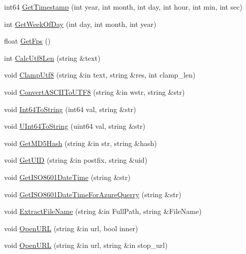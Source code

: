 \begin{DoxyCompactItemize}
\item 
int64 \hyperlink{class_scene_script_core_utils_a106ae27358ab3b6cc073665ca13ade2a}{Get\+Timestamp} (int year, int month, int day, int hour, int min, int sec)
\item 
int \hyperlink{class_scene_script_core_utils_a5600deb19c410de48dcfea3b5231f4e1}{Get\+Week\+Of\+Day} (int day, int month, int year)
\item 
float \hyperlink{class_scene_script_core_utils_a7380a399dd6dc66de6d0ebb94730269e}{Get\+Fps} ()
\item 
int \hyperlink{class_scene_script_core_utils_a3fc4ba1bbf123ddb308dc694074a61d9}{Calc\+Utf8\+Len} (string \&text)
\item 
void \hyperlink{class_scene_script_core_utils_a37741b646b2e6f68cf3b5a320379b4a6}{Clamp\+Utf8} (string \&in text, string \&res, int clamp\+\_\+len)
\item 
void \hyperlink{class_scene_script_core_utils_a7f1fe71148c0f4104b1ee2e618b2b275}{Convert\+A\+S\+C\+I\+I\+To\+U\+T\+F8} (string \&in wstr, string \&str)
\item 
void \hyperlink{class_scene_script_core_utils_ad10fe7b2df7b2d4de06f34967420da15}{Int64\+To\+String} (int64 val, string \&str)
\item 
void \hyperlink{class_scene_script_core_utils_a7d31b445a6247eea0adac3473a4691df}{U\+Int64\+To\+String} (uint64 val, string \&str)
\item 
void \hyperlink{class_scene_script_core_utils_a0f701e398ad5a9c5e85d842fee541894}{Get\+M\+D5\+Hash} (string \&in str, string \&hash)
\item 
void \hyperlink{class_scene_script_core_utils_af5eaaad32fb32c6a6f11a37686e691dd}{Get\+U\+ID} (string \&in postfix, string \&uid)
\item 
void \hyperlink{class_scene_script_core_utils_a82c988bc35f1a57634f324190edcd8b2}{Get\+I\+S\+O8601\+Date\+Time} (string \&str)
\item 
void \hyperlink{class_scene_script_core_utils_a6fce3dbb278a56415f73d8cad625092a}{Get\+I\+S\+O8601\+Date\+Time\+For\+Azure\+Querry} (string \&str)
\item 
void \hyperlink{class_scene_script_core_utils_a37aee74c8e532f969c94fab04bc54bf9}{Extract\+File\+Name} (string \&in Full\+Path, string \&File\+Name)
\item 
void \hyperlink{class_scene_script_core_utils_abc64efec7afd2f9fb0256d56dc08f88a}{Open\+U\+RL} (string \&in url, bool inner)
\item 
void \hyperlink{class_scene_script_core_utils_a4e1b43e01447ffe267b52b8d7b8369a3}{Open\+U\+RL} (string \&in url, string \&in stop\+\_\+url)

\end{DoxyCompactItemize}
